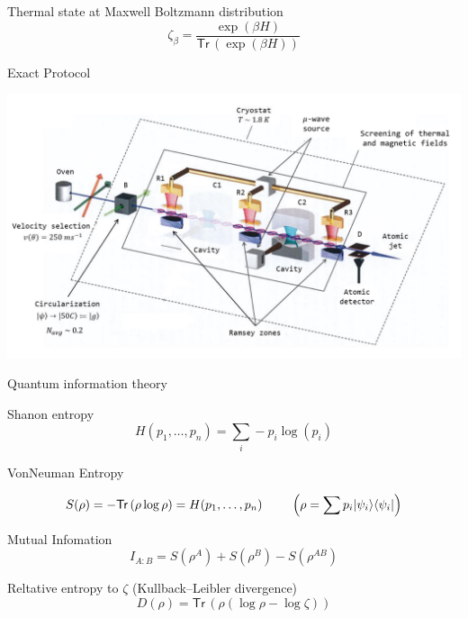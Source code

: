 \documentclass{beamer}
\newcommand{\ket}[1]{|#1\rangle}
\newcommand{\bra}[1]{\langle#1|}
\newcommand{\Tr}{\mathsf{Tr}\,}
\newcommand{\trnorm}[1]{\frac{#1}{\Tr\left({#1}\right)}}
\newcommand{\gap}{\hspace{0.8cm}}
\begin{document}
\begin{frame}{Thermal state at Maxwell Boltzmann distribution}
  \[\zeta_\beta = \trnorm{{\exp(\beta H)}}\]
\end{frame}

\begin{frame}{Exact Protocol}
  \vfill

  \includegraphics[width=\textwidth]{exp.png}
\end{frame}


\begin{frame}{Quantum information theory}

  \begin{block}{Shanon entropy}
    \[H(p_1,\ldots,p_n) = \sum_i -p_i\log (p_i)\]

  \vspace{-0.2cm}

  \end{block}

  \pause{}

  \begin{block}{VonNeuman Entropy}

  \vspace{-0.3cm}

    \[S(\rho) = -\Tr(\rho\log \rho) = H(p_1,\ldots,p_n) \gap \left(\rho = \sum p_i
      \ket {\psi_i}\bra{\psi_i}\right)\]

  \vspace{-0.2cm}

  \end{block}

  \pause{}

  \begin{block}{Mutual Infomation}
    \[I_{A:B} = S(\rho^A) + S(\rho^B) - S(\rho^{AB})\]
  \end{block}

  \pause{}

  \begin{block}{Reltative entropy to $\zeta$ (Kullback–Leibler divergence)}
    \[D(\rho) = \Tr(\rho (\log \rho - \log \zeta))\]
  \end{block}
\end{frame}
\end{document}
